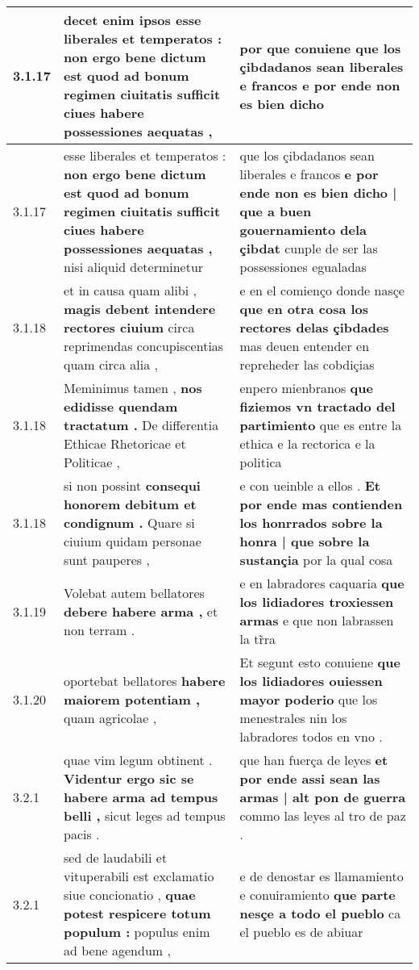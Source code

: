 \begin{tabular}{|p{1cm}|p{6.5cm}|p{6.5cm}|}
3.1.17 & decet enim ipsos \textbf{ esse liberales et temperatos : } non ergo bene dictum est quod ad bonum regimen ciuitatis sufficit ciues habere possessiones aequatas , & por que conuiene \textbf{ que los çibdadanos sean liberales e francos } e por ende non es bien dicho \\\hline
3.1.17 & esse liberales et temperatos : \textbf{ non ergo bene dictum est quod ad bonum regimen ciuitatis sufficit ciues habere possessiones aequatas , } nisi aliquid determinetur & que los çibdadanos sean liberales e francos \textbf{ e por ende non es bien dicho | que a buen gouernamiento dela çibdat } cunple de ser las possessiones egualadas \\\hline
3.1.18 & et in causa quam alibi , \textbf{ magis debent intendere rectores ciuium } circa reprimendas concupiscentias quam circa alia , & e en el comienço donde nasçe \textbf{ que en otra cosa los rectores delas çibdades } mas deuen entender en repreheder las cobdiçias \\\hline
3.1.18 & Meminimus tamen , \textbf{ nos edidisse quendam tractatum . } De differentia Ethicae Rhetoricae et Politicae , & enpero mienbranos \textbf{ que fiziemos vn tractado del partimiento } que es entre la ethica e la rectorica e la politica \\\hline
3.1.18 & si non possint \textbf{ consequi honorem debitum et condignum . } Quare si ciuium quidam personae sunt pauperes , & e con ueinble a ellos . \textbf{ Et por ende mas contienden los honrrados sobre la honra | que sobre la sustançia } por la qual cosa \\\hline
3.1.19 & Volebat autem bellatores \textbf{ debere habere arma , } et non terram . & e en labradores caquaria \textbf{ que los lidiadores troxiessen armas } e que non labrassen la tr̃ra \\\hline
3.1.20 & oportebat bellatores \textbf{ habere maiorem potentiam , } quam agricolae , & Et segunt esto conuiene \textbf{ que los lidiadores ouiessen mayor poderio } que los menestrales nin los labradores todos en vno . \\\hline
3.2.1 & quae vim legum obtinent . \textbf{ Videntur ergo sic se habere arma ad tempus belli , } sicut leges ad tempus pacis . & que han fuerça de leyes \textbf{ et por ende assi sean las armas | alt pon de guerra } commo las leyes al tro de paz . \\\hline
3.2.1 & sed de laudabili et vituperabili est exclamatio siue concionatio , \textbf{ quae potest respicere totum populum : } populus enim ad bene agendum , & e de denostar es llamamiento e conuiramiento \textbf{ que parte nesçe a todo el pueblo } ca el pueblo es de abiuar \\\hline

\end{tabular}
